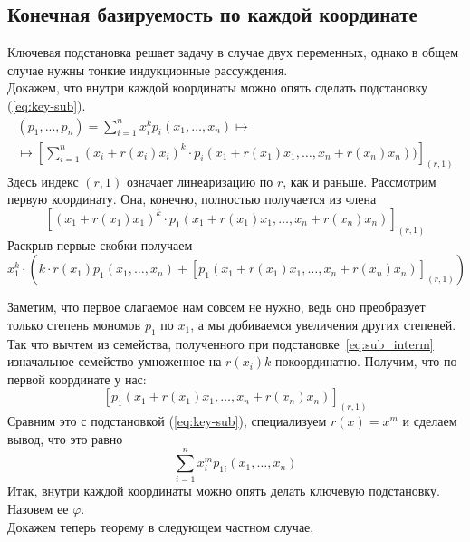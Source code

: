 \subsection{Конечная базируемость по каждой координате}\label{subsec:local}
Ключевая подстановка решает задачу в случае двух переменных, однако в общем случае нужны тонкие индукционные рассуждения.\\
Докажем, что внутри каждой координаты можно опять сделать подстановку (\ref{eq:key-sub}).
\begin{multline*}
(p_1,...,p_n)
    =\sum\limits_{i=1}^n x^k_i p_i(x_1,\ldots,x_n)\mapsto\\\mapsto [\sum\limits_{i=1}^n (x_i+r(x_i)x_i)^k\cdot p_i(x_1+r(x_1)x_1,\ldots,x_n+r(x_n)x_n))]_{(r,1)}
\end{multline*}Здесь индекс $(r,1)$ означает линеаризацию по $r$, как и раньше.
Рассмотрим первую координату.
Она, конечно, полностью получается из члена
\[[(x_1+r(x_1)x_1)^k\cdot p_1(x_1+r(x_1)x_1,\ldots,x_n+r(x_n)x_n)]_{(r,1)}\]Раскрыв первые скобки получаем
\begin{equation}
    \label{eq:sub_interm}
    x_1^k\cdot(k\cdot r(x_1) p_1(x_1,\ldots,x_n)+ [p_1(x_1+r(x_1)x_1,\ldots,x_n+r(x_n)x_n)]_{(r,1)})
\end{equation}

Заметим, что первое слагаемое нам совсем не нужно, ведь оно преобразует только степень мономов $p_1$ по $x_1$, а мы добиваемся увеличения других степеней.
Так что вычтем из семейства, полученного при подстановке~\eqref{eq:sub_interm} изначальное семейство умноженное на $r(x_i)k$ покоординатно.
Получим, что по первой координате у нас:
\[[p_1(x_1+r(x_1)x_1,\ldots,x_n+r(x_n)x_n)]_{(r,1)}\]Сравним это с подстановкой (\ref{eq:key-sub}), специализуем $r(x)=x^m$ и сделаем вывод, что это равно
\begin{equation}
    \label{eq:key_inside}
    \sum\limits_{i=1}^n x_i^m p_{1i}(x_1,\ldots,x_n)
\end{equation}
Итак, внутри каждой координаты можно опять делать ключевую подстановку.
Назовем ее $\varphi$.\\
Докажем теперь теорему в следующем частном случае.

